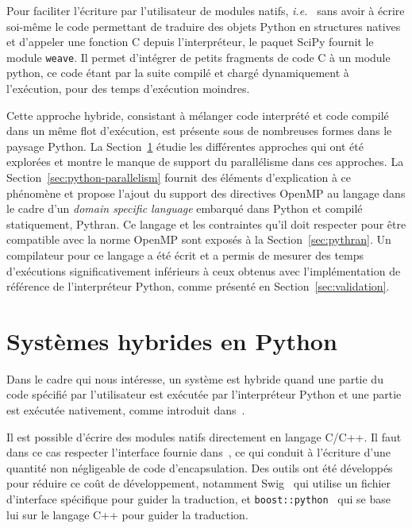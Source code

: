 \documentclass[renpar]{compas2013}
\begin{document}
Pour faciliter l'écriture par l'utilisateur de modules natifs, \emph{i.e.\
} sans avoir à écrire soi-même le code permettant de traduire des objets
Python en structures natives et d'appeler une fonction C depuis
l'interpréteur, le paquet SciPy fournit le module \texttt{weave}. Il
permet d'intégrer de petits fragments de code C à un module python, ce
code étant par la suite compilé et chargé dynamiquement à l'exécution,
pour des temps d'exécution moindres.

Cette approche hybride, consistant à mélanger code interprété et code
compilé dans un même flot d'exécution, est présente sous de nombreuses
formes dans le paysage Python. La Section~\ref{sec:python-hybrid} étudie
les différentes approches qui ont été explorées et montre le manque de
support du parallélisme dans ces approches. La
Section~\ref{sec:python-parallelism} fournit des éléments d'explication à
ce phénomène et propose l'ajout du support des directives OpenMP au
langage dans le cadre d'un \emph{domain specific language} embarqué dans
Python et compilé statiquement, Pythran. Ce langage et les contraintes
qu'il doit respecter pour être compatible avec
la norme OpenMP sont exposés à la Section~\ref{sec:pythran}. Un
compilateur pour ce langage a été écrit et a permis de mesurer des temps
d'exécutions significativement inférieurs à ceux obtenus avec
l'implémentation de référence de l'interpréteur Python, comme présenté en
Section~\ref{sec:validation}.

\section{Systèmes hybrides en Python}\label{sec:python-hybrid}

Dans le cadre qui nous intéresse, un système est hybride quand une partie du
code spécifié par l'utilisateur est exécutée par l'interpréteur Python et une
partie est exécutée nativement, comme introduit dans~\cite{dongara2007}.

Il est possible d'écrire des modules natifs directement en langage C/C++.
Il faut dans ce cas respecter l'interface fournie dans~\cite{pythoncapi},
ce qui conduit à l'écriture d'une quantité non négligeable de code
d'encapsulation. Des outils ont été développés pour réduire ce coût de
développement, notamment Swig~\cite{swig2003} qui utilise un fichier
d'interface spécifique pour guider la traduction, et
\texttt{boost::python}~\cite{boostpython2007} qui se base lui sur le
langage C++ pour guider la traduction.
\end{document}
